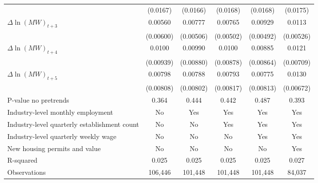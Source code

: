 {\begin{tabular}{l*{5}{c}}
          & (0.0167)         & (0.0166)         & (0.0168)         & (0.0168)         & (0.0175)         \\
[1em]
$\Delta \ln(MW)_{t+3}$&  0.00560         &  0.00777         &  0.00765         &  0.00929\sym{*}  &   0.0113\sym{**} \\
          &(0.00600)         &(0.00506)         &(0.00502)         &(0.00492)         &(0.00526)         \\
[1em]
$\Delta \ln(MW)_{t+4}$&   0.0100         &  0.00990         &   0.0100         &  0.00885         &   0.0121\sym{*}  \\
          &(0.00939)         &(0.00880)         &(0.00878)         &(0.00864)         &(0.00709)         \\
[1em]
$\Delta \ln(MW)_{t+5}$&  0.00798         &  0.00788         &  0.00793         &  0.00775         &   0.0130\sym{*}  \\
          &(0.00808)         &(0.00802)         &(0.00817)         &(0.00813)         &(0.00672)         \\
\hline
P-value no pretrends&    0.364         &    0.444         &    0.442         &    0.487         &    0.393         \\
Industry-level monthly employment&       No         &      Yes         &      Yes         &      Yes         &      Yes         \\
Industry-level quarterly establishment count&       No         &       No         &      Yes         &      Yes         &      Yes         \\
Industry-level quarterly weekly wage&       No         &       No         &       No         &      Yes         &      Yes         \\
New housing permits and value&       No         &       No         &       No         &       No         &      Yes         \\
R-squared &    0.025         &    0.025         &    0.025         &    0.025         &    0.027         \\
Observations&  106,446         &  101,448         &  101,448         &  101,448         &   84,037         \\
\hline\hline
\end{tabular}
}

